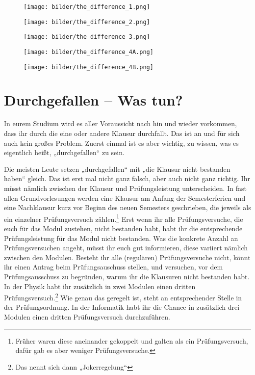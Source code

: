 
\begin{figure*}[t]
    \centering
    \begin{subfigure}[b]{.18\textwidth}
        \texttt{[image: bilder/the\_difference\_1.png]}
    \end{subfigure}
    \begin{subfigure}[b]{.18\textwidth}
        \texttt{[image: bilder/the\_difference\_2.png]}
    \end{subfigure}
    \begin{subfigure}[b]{.18\textwidth}
        \texttt{[image: bilder/the\_difference\_3.png]}
    \end{subfigure}
    \begin{subfigure}[b]{.18\textwidth}
        \texttt{[image: bilder/the\_difference\_4A.png]}
    \end{subfigure}
    \begin{subfigure}[b]{.18\textwidth}
        \texttt{[image: bilder/the\_difference\_4B.png]}
    \end{subfigure}
\end{figure*}

\vspace{-3mm}
\section{Durchgefallen -- Was tun?}

In eurem Studium wird es aller Voraussicht nach hin und wieder vorkommen, dass ihr durch die eine oder andere Klausur durchfallt. Das ist an und für sich auch kein großes Problem. Zuerst einmal ist es aber wichtig, zu wissen, was es eigentlich heißt, „durchgefallen“ zu sein.

Die meisten Leute setzen „durchgefallen“ mit „die Klausur nicht bestanden haben“ gleich. Das ist erst mal nicht ganz falsch, aber auch nicht ganz richtig. Ihr müsst nämlich zwischen der Klausur und Prüfungsleistung unterscheiden. In fast allen Grundvorlesungen werden eine Klausur am Anfang der Semesterferien und eine Nachklausur kurz vor Beginn des neuen Semesters geschrieben, die jeweils als ein einzelner Prüfungsversuch zählen.\footnote{Früher waren diese aneinander gekoppelt und galten als ein Prüfungsversuch, dafür gab es aber weniger Prüfungsversuche.}
Erst wenn ihr alle Prüfungsversuche, die euch für das Modul zustehen, nicht bestanden habt, habt ihr die entsprechende Prüfungsleistung für das Modul nicht bestanden. Was die konkrete Anzahl an Prüfungsversuchen angeht, müsst ihr euch gut informieren, diese variiert nämlich zwischen den Modulen. Besteht ihr alle (regulären) Prüfungsversuche nicht, könnt ihr einen Antrag beim Prüfungsauschuss stellen, und versuchen, vor dem Prüfungsausschuss zu begründen, warum ihr die Klausuren nicht bestanden habt. In der Physik habt ihr zusätzlich in zwei Modulen einen dritten Prüfungsversuch.\footnote{Das nennt sich dann „Jokerregelung“} Wie genau das geregelt ist, steht an entsprechender Stelle in der Prüfungsordnung. In der Informatik habt ihr die Chance in zusätzlich drei Modulen einen dritten Prüfungsversuch durchzuführen.


